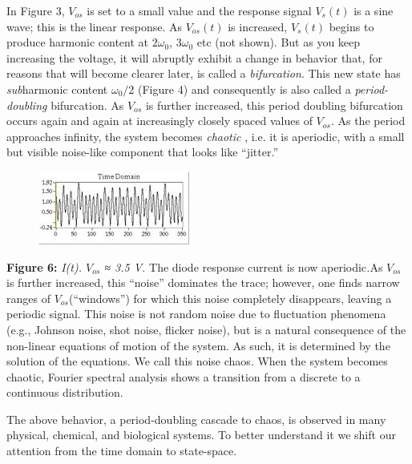 \documentclass{../lab}
\begin{document}
In Figure 3, $V_{os}$ is set to a small value and the response signal $V_s(t)$ is a sine wave; this is the linear response. As $V_{os}(t)$ is increased, $V_s(t)$\emph{ }begins to produce harmonic content at $2\omega_0$, $3\omega_0$ etc (not shown). But as you keep increasing the voltage, it will abruptly exhibit a change in behavior that, for reasons that will become clearer later, is called a \emph{bifurcation}. This new state has \emph{sub}harmonic content $\omega_0/2$ (Figure 4) and consequently is also called a \emph{period-doubling} bifurcation. As $V_{os}$ is further increased, this period doubling bifurcation occurs again and again at increasingly closely spaced values of $V_{os}$. As the period approaches infinity, the system becomes \emph{chaotic} , i.e. it is aperiodic, with a small but visible noise-like component that looks like ``jitter.''


\begin{figure}[h]
    \centering
    \href{http://experimentationlab.berkeley.edu/sites/default/files/images/Nldimage019.jpg}{\includegraphics[width=0.5\linewidth]{images/Nldimage019.jpg}}
    \caption{}
    \label{fig:Nldimage019}
\end{figure}

\textbf{Figure 6:} \emph{I(t). $V_{os}$ ≈ 3.5 V. }The diode response current is now aperiodic\emph{.}As $V_{os}$ is further increased, this ``noise'' dominates the trace; however, one finds narrow ranges of  $V_{os}$(``windows'') for which this noise completely disappears, leaving a periodic signal. This noise is not random noise due to fluctuation phenomena (e.g., Johnson noise, shot noise, flicker noise), but is a natural consequence of the non-linear equations of motion of the system. As such, it is determined by the solution of the equations. We call this noise chaos. When the system becomes chaotic, Fourier spectral analysis shows a transition from a discrete to a continuous distribution.

The above behavior, a period-doubling cascade to chaos, is observed in many physical, chemical, and biological systems. To better understand it we shift our attention from the time domain to state-space.
\end{document}
